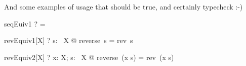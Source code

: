 And some examples of usage that should be true, and certainly typecheck :-)
\begin{theorem}{seqEuiv1}
   \vdash?  \rseq =  \rangle
\end{theorem}

\begin{theorem}{revEquiv1}[X]
    \vdash? \forall s: \seq~X @ reverse~s = rev~s
\end{theorem}

\begin{theorem}{revEquiv2}[X]
    \vdash? \forall x: X; s: \seq~X @ reverse~(\lseq x \rseq \cat s) = rev~(\langle x \rangle \cat s)
\end{theorem}


